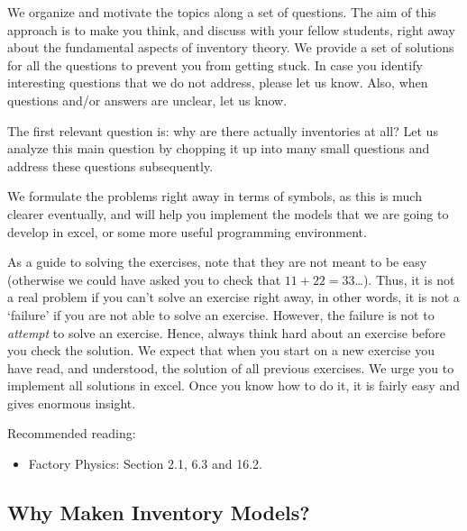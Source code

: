 
We organize and motivate the topics along a set of questions.  The aim
of this approach is to make you think, and discuss with your fellow
students, right away about the fundamental aspects of inventory
theory.  We provide a set of solutions for all the questions to
prevent you from getting stuck.  In case you identify interesting
questions that we do not address, please let us know. Also, when
questions and/or answers are unclear, let us know.

The first relevant question is: why are there actually inventories at
all? Let us analyze this main question by chopping it up into many
small questions and address these questions subsequently. 

We formulate the problems right away in terms of symbols, as this is
much clearer eventually, and will help you implement the models that
we are going to develop in excel, or some more useful programming
environment.


As a guide to  solving the exercises, note that they are not meant
to be easy (otherwise we could have asked you to check that
$11+22=33$\ldots). Thus, it is not a real problem if you can't solve
an exercise right away, in other words, it is not a `failure' if you
are not able to solve an exercise. However, the failure is not to
\emph{attempt} to solve an exercise. Hence, always think hard about an
exercise before you check the solution.  We expect that when you start
on a new exercise you have read, and understood, the solution of all
previous exercises. We urge you to implement all solutions in
excel. Once you know how to do it, it is fairly easy and gives
enormous insight.



Recommended reading:
\begin{itemize}
\item Factory Physics: Section 2.1, 6.3 and  16.2. 
\end{itemize}

\subsection{Why Maken Inventory Models?}
\label{sec:inventory-modeling}

